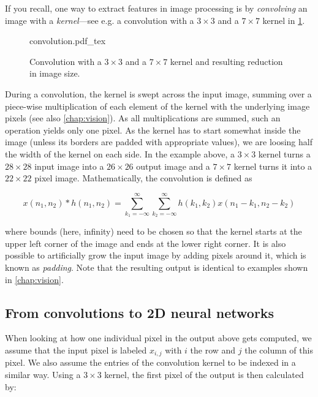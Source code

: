 If you recall, one way to extract features in image processing is by \textsl{convolving} an image with a \textsl{kernel}---see e.g. a convolution with a $3\times3$ and a $7\times7$ kernel in \cref{fig:convolution}.
%
\begin{figure}[htb]
    \centering
    \def\svgwidth{0.8\textwidth}
    {convolution.pdf_tex}
    \caption{Convolution with a $3\times3$ and a $7\times7$ kernel and resulting reduction in image size.\label{fig:convolution}}
\end{figure}
%
During a convolution, the kernel is swept across the input image, summing over a piece-wise multiplication of each element of the kernel with the underlying image pixels (see also \cref{chap:vision}). As all multiplications are summed, such an operation yields only one pixel. As the kernel has to start somewhat inside the image (unless its borders are padded with appropriate values), we are loosing half the width of the kernel on each side. In the example above, a $3\times3$ kernel turns a $28\times28$ input image into a $26\times26$ output image and a $7\times7$ kernel turns it into a $22\times22$ pixel image. Mathematically, the convolution is defined as

\begin{equation}
x(n_1,n_2)*h(n_1,n_2)=\sum_{k_1=-\infty}^{\infty} \sum_{k_2=-\infty}^{\infty} h(k_1,k_2)x(n_1-k_1,n_2-k_2)
\end{equation}

where bounds (here, infinity) need to be chosen so that the kernel starts at the upper left corner of the image and ends at the lower right corner. It is also possible to artificially grow the input image by adding pixels around it, which is known as \textsl{padding}. Note that the resulting output is identical to examples shown in \cref{chap:vision}.

\subsection{From convolutions to 2D neural networks}

When looking at how one individual pixel in the output above gets computed, we assume that the input pixel is labeled $x_{i,j}$ with $i$ the row and $j$ the column of this pixel. We also assume the entries of the convolution kernel to be indexed in a similar way. Using a $3\times3$ kernel, the first pixel of the output is then calculated by:

